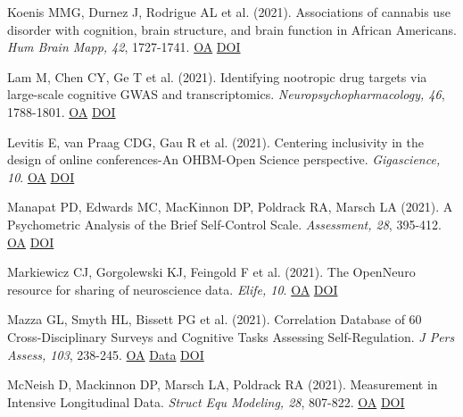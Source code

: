 \documentclass[10pt, letterpaper]{article}
\begin{document}
Koenis MMG, Durnez J, Rodrigue AL et al. (2021). Associations of cannabis use disorder with cognition, brain structure, and brain function in African Americans. \textit{Hum Brain Mapp, 42}, 1727-1741. \href{https://www.ncbi.nlm.nih.gov/pmc/articles/PMC7978126}{OA} \href{http://dx.doi.org/10.1002/hbm.25324}{DOI} \vspace{2mm}

Lam M, Chen CY, Ge T et al. (2021). Identifying nootropic drug targets via large-scale cognitive GWAS and transcriptomics. \textit{Neuropsychopharmacology, 46}, 1788-1801. \href{https://www.ncbi.nlm.nih.gov/pmc/articles/PMC8357785}{OA} \href{http://dx.doi.org/10.1038/s41386-021-01023-4}{DOI} \vspace{2mm}

Levitis E, van Praag CDG, Gau R et al. (2021). Centering inclusivity in the design of online conferences-An OHBM-Open Science perspective. \textit{Gigascience, 10}. \href{https://www.ncbi.nlm.nih.gov/pmc/articles/PMC8377301}{OA} \href{http://dx.doi.org/10.1093/gigascience/giab051}{DOI} \vspace{2mm}

Manapat PD, Edwards MC, MacKinnon DP, Poldrack RA, Marsch LA (2021). A Psychometric Analysis of the Brief Self-Control Scale. \textit{Assessment, 28}, 395-412. \href{https://www.ncbi.nlm.nih.gov/pmc/articles/PMC7261631}{OA} \href{http://dx.doi.org/10.1177/1073191119890021}{DOI} \vspace{2mm}

Markiewicz CJ, Gorgolewski KJ, Feingold F et al. (2021). The OpenNeuro resource for sharing of neuroscience data. \textit{Elife, 10}. \href{https://www.ncbi.nlm.nih.gov/pmc/articles/PMC8550750}{OA} \href{http://dx.doi.org/10.7554/elife.71774}{DOI} \vspace{2mm}

Mazza GL, Smyth HL, Bissett PG et al. (2021). Correlation Database of 60 Cross-Disciplinary Surveys and Cognitive Tasks Assessing Self-Regulation. \textit{J Pers Assess, 103}, 238-245. \href{https://www.ncbi.nlm.nih.gov/pmc/articles/PMC7483539}{OA} \href{https://github.com/IanEisenberg/Self_Regulation_Ontology/tree/master/Data}{Data} \href{http://dx.doi.org/10.1080/00223891.2020.1732994}{DOI} \vspace{2mm}

McNeish D, Mackinnon DP, Marsch LA, Poldrack RA (2021). Measurement in Intensive Longitudinal Data. \textit{Struct Equ Modeling, 28}, 807-822. \href{https://www.ncbi.nlm.nih.gov/pmc/articles/PMC8562472}{OA} \href{http://dx.doi.org/10.1080/10705511.2021.1915788}{DOI} \vspace{2mm}
\end{document}
